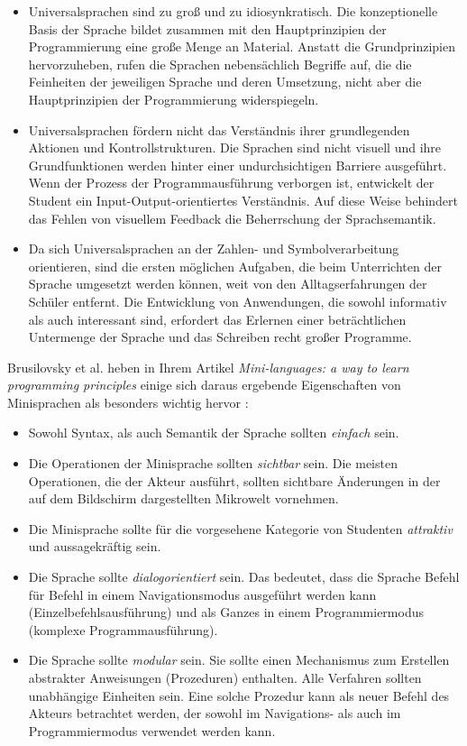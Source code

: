 \begin{itemize}
    \item Universalsprachen sind zu groß und zu idiosynkratisch. Die konzeptionelle Basis der Sprache bildet zusammen mit den Hauptprinzipien der Programmierung eine große Menge an Material. Anstatt die Grundprinzipien hervorzuheben, rufen die Sprachen nebensächlich Begriffe auf, die die Feinheiten der jeweiligen Sprache und deren Umsetzung, nicht aber die Hauptprinzipien der Programmierung widerspiegeln.
    \item Universalsprachen fördern nicht das Verständnis ihrer grundlegenden Aktionen und Kontrollstrukturen. Die Sprachen sind nicht visuell und ihre Grundfunktionen werden hinter einer undurchsichtigen Barriere ausgeführt. Wenn der Prozess der Programmausführung verborgen ist, entwickelt der Student ein In\-put-Out\-put-ori\-en\-tiertes Verständnis. Auf diese Weise behindert das Fehlen von visuellem Feedback die Beherrschung der Sprachsemantik.
    \item Da sich Universalsprachen an der Zahlen- und Symbolverarbeitung orientieren, sind die ersten möglichen Aufgaben, die beim Unterrichten der Sprache umgesetzt werden können, weit von den Alltagserfahrungen der Schüler entfernt. Die Entwicklung von Anwendungen, die sowohl informativ als auch interessant sind, erfordert das Erlernen einer beträchtlichen Untermenge der Sprache und das Schreiben recht großer Programme.
\end{itemize}

Brusilovsky et al. heben in Ihrem Artikel \textit{Mini-languages: a way to learn programming principles} einige sich daraus ergebende Eigenschaften von Minisprachen als besonders wichtig hervor \cite[73-74]{brusilovsky1997}:

\begin{itemize}
    \item Sowohl Syntax, als auch Semantik der Sprache sollten \emph{einfach} sein.
    \item Die Operationen der Minisprache sollten \emph{sichtbar} sein. Die meisten Operationen, die der Akteur ausführt, sollten sichtbare Änderungen in der auf dem Bildschirm dargestellten Mikrowelt vornehmen.
    \item Die Minisprache sollte für die vorgesehene Kategorie von Studenten \emph{attraktiv} und aussagekräftig sein.
    \item Die Sprache sollte \emph{dialogorientiert} sein. Das bedeutet, dass die Sprache Befehl für Befehl in einem Navigationsmodus ausgeführt werden kann (Einzelbefehlsausführung) und als Ganzes in einem Programmiermodus (komplexe Programmausführung).
    \item Die Sprache sollte \emph{modular} sein. Sie sollte einen Mechanismus zum Erstellen abstrakter Anweisungen (Prozeduren) enthalten. Alle Verfahren sollten unabhängige Einheiten sein. Eine solche Prozedur kann als neuer Befehl des Akteurs betrachtet werden, der sowohl im Navigations- als auch im Programmiermodus verwendet werden kann.
\end{itemize}

